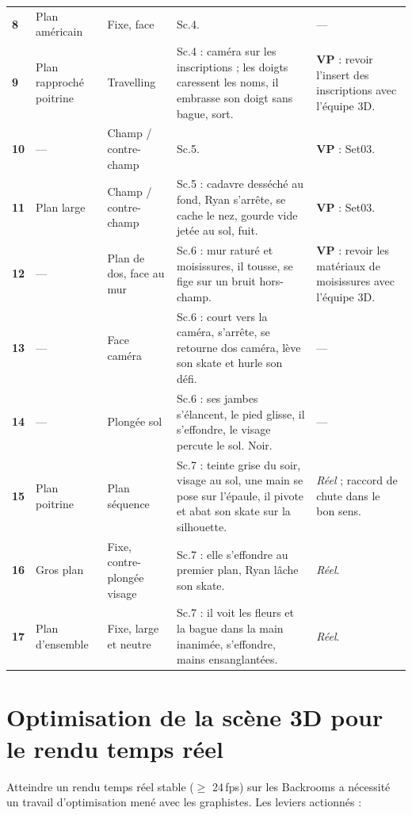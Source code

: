 \documentclass[11pt,a4paper]{report}
\begin{document}
\begin{center}
\begin{longtable}{>{\bfseries}p{0.5cm} >{\RaggedRight\arraybackslash}p{2.5cm} >{\RaggedRight\arraybackslash}p{2.6cm} >{\RaggedRight\arraybackslash}p{4.2cm} >{\RaggedRight\arraybackslash}p{3.4cm}}
8 & Plan américain & Fixe, face & Sc.4. & --- \\
9 & Plan rapproché poitrine & Travelling & Sc.4 : caméra sur les inscriptions ; les doigts caressent les noms, il embrasse son doigt sans bague, sort. & \textbf{VP} : revoir l'insert des inscriptions avec l'équipe 3D. \\
10 & --- & Champ / contre-champ & Sc.5. & \textbf{VP} : Set03. \\
11 & Plan large & Champ / contre-champ & Sc.5 : cadavre desséché au fond, Ryan s'arrête, se cache le nez, gourde vide jetée au sol, fuit. & \textbf{VP} : Set03. \\
12 & --- & Plan de dos, face au mur & Sc.6 : mur raturé et moisissures, il tousse, se fige sur un bruit hors-champ. & \textbf{VP} : revoir les matériaux de moisissures avec l'équipe 3D. \\
13 & --- & Face caméra & Sc.6 : court vers la caméra, s'arrête, se retourne dos caméra, lève son skate et hurle son défi. & --- \\
14 & --- & Plongée sol & Sc.6 : ses jambes s'élancent, le pied glisse, il s'effondre, le visage percute le sol. Noir. & --- \\
15 & Plan poitrine & Plan séquence & Sc.7 : teinte grise du soir, visage au sol, une main se pose sur l'épaule, il pivote et abat son skate sur la silhouette. & \textit{Réel} ; raccord de chute dans le bon sens. \\
16 & Gros plan & Fixe, contre-plongée visage & Sc.7 : elle s'effondre au premier plan, Ryan lâche son skate. & \textit{Réel}. \\
17 & Plan d'ensemble & Fixe, large et neutre & Sc.7 : il voit les fleurs et la bague dans la main inanimée, s'effondre, mains ensanglantées. & \textit{Réel}. \\
\end{longtable}
\end{center}

\section{Optimisation de la scène 3D pour le rendu temps réel}
Atteindre un rendu temps réel stable ($\geq$ 24\,fps) sur les Backrooms a nécessité un travail d'optimisation mené avec les graphistes. Les leviers actionnés :
\end{document}
